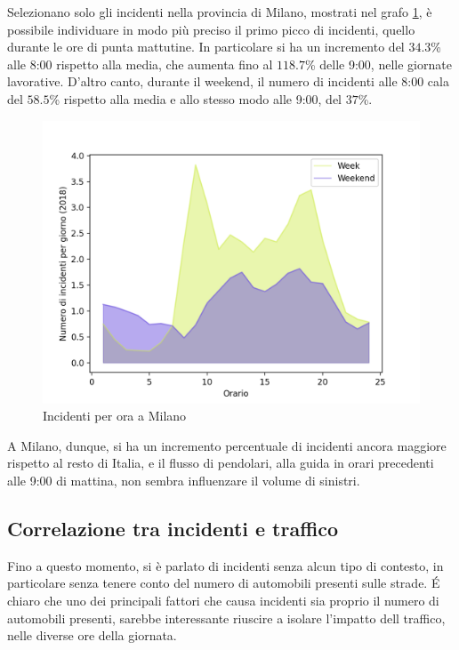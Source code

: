 \documentclass[a4paper,12pt]{report}
\begin{document}
Selezionano solo gli incidenti nella provincia di Milano, mostrati nel grafo 
\ref{fig:week-weekend-milano}, è possibile individuare in modo più preciso
il primo picco di incidenti, quello durante le ore di punta mattutine.
In particolare si ha un incremento del $34.3$\% alle 8:00 rispetto alla media, 
che aumenta fino al $118.7$\% delle 9:00, nelle giornate lavorative.
D'altro canto, durante il weekend, il numero di incidenti alle 8:00 cala del $58.5$\% rispetto 
alla media e allo stesso modo alle 9:00, del $37$\%.

\begin{figure}
    \includegraphics[width=\linewidth]{../src/incidenti/incidenti_senza_coords/ore_punta/week_weekend_milano.png}
    \caption{Incidenti per ora a Milano}
    \label{fig:week-weekend-milano}
\end{figure}

A Milano, dunque, si ha un incremento percentuale di incidenti ancora maggiore 
rispetto al resto di Italia, e il flusso di pendolari, alla guida in orari precedenti 
alle 9:00 di mattina, non sembra influenzare il volume di sinistri.

\subsection{Correlazione tra incidenti e traffico}

Fino a questo momento, si è parlato di incidenti senza alcun tipo di contesto, in 
particolare senza tenere conto del numero di automobili presenti sulle strade. 
\'E chiaro che uno dei principali fattori che causa incidenti sia proprio 
il numero di automobili presenti, sarebbe interessante riuscire a isolare 
l'impatto dell traffico, nelle diverse ore della giornata.
\end{document}
